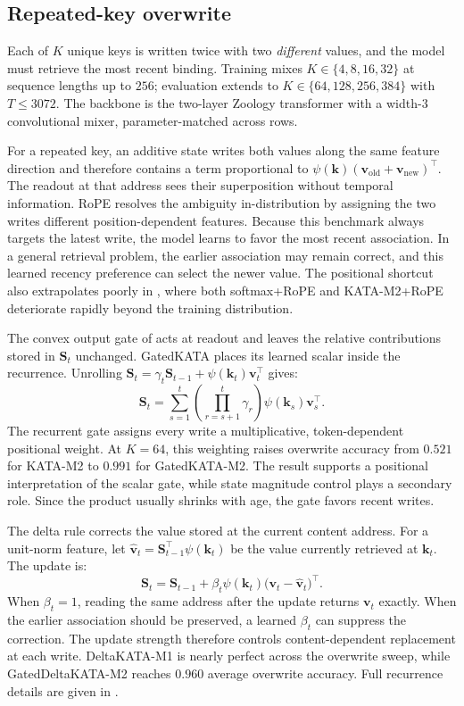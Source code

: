 \documentclass{article}
\newcommand{\1}{\bm{1}}
\def\vk{{\bm{k}}}
\def\vv{{\bm{v}}}
\def\mS{{\bm{S}}}
\newcommand{\seql}{T}
\theoremstyle{definition}
\begin{document}
\subsection{Repeated-key overwrite}
\label{ssec:results-overwrite}

Each of $K$ unique keys is written twice with two \emph{different} values, and the model must
retrieve the most recent binding. Training mixes $K\in\{4,8,16,32\}$ at sequence lengths up to
$256$; evaluation extends to $K\in\{64,128,256,384\}$ with $\seql\le 3072$. The backbone is the
two-layer Zoology transformer with a width-$3$ convolutional mixer, parameter-matched across rows.

For a repeated key, an additive state writes both values along the same feature direction and
therefore contains a term proportional to
$\psi(\vk)(\vv_{\mathrm{old}}+\vv_{\mathrm{new}})^\top$. The readout at that address sees
their superposition without temporal information. RoPE resolves the ambiguity in-distribution by
assigning the two writes different position-dependent features. Because this benchmark always
targets the latest write, the model learns to favor the most recent association. In a general
retrieval problem, the earlier association may remain correct, and this learned recency preference
can select the newer value. The positional shortcut also extrapolates poorly in
, where both softmax+RoPE and KATA-M2+RoPE deteriorate rapidly beyond the
training distribution.

The convex output gate of  acts at readout and leaves the relative
contributions stored in $\mS_t$ unchanged. GatedKATA places its learned scalar inside the
recurrence. Unrolling
$\mS_t=\gamma_t\mS_{t-1}+\psi(\vk_t)\vv_t^\top$ gives:
\[
  \mS_t
  =\sum_{s=1}^{t}
    \left(\prod_{r=s+1}^{t}\gamma_r\right)
    \psi(\vk_s)\vv_s^\top.
\]
The recurrent gate assigns every write a multiplicative, token-dependent positional weight. At
$K{=}64$, this weighting raises overwrite accuracy from $0.521$ for KATA-M2 to $0.991$ for
GatedKATA-M2. The result supports a positional interpretation of the scalar gate, while state
magnitude control plays a secondary role. Since the product usually shrinks with age, the gate
favors recent writes.

The delta rule corrects the value stored at the current content address. For a unit-norm feature,
let $\widehat{\vv}_t=\mS_{t-1}^\top\psi(\vk_t)$ be the value currently retrieved at $\vk_t$.
The update is:
\[
  \mS_t
  =\mS_{t-1}
  +\beta_t\psi(\vk_t)\bigl(\vv_t-\widehat{\vv}_t\bigr)^\top.
\]
When $\beta_t=1$, reading the same address after the update returns $\vv_t$ exactly. When the
earlier association should be preserved, a learned $\beta_t$ can suppress the correction. The
update strength therefore controls content-dependent replacement at each write.
DeltaKATA-M1 is nearly perfect across the overwrite sweep, while GatedDeltaKATA-M2 reaches
$0.960$ average overwrite accuracy. Full recurrence details are given in .
\end{document}
